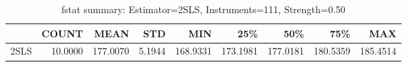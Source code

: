 \begin{table}[ht]
\centering
\caption{fstat summary: Estimator=2SLS, Instruments=111, Strength=0.50}
\begin{tabular}{lrrrrrrrr}
\toprule
 & COUNT & MEAN & STD & MIN & 25\% & 50\% & 75\% & MAX \\
\midrule
2SLS & 10.0000 & 177.0070 & 5.1944 & 168.9331 & 173.1981 & 177.0181 & 180.5359 & 185.4514 \\
\bottomrule
\end{tabular}
\end{table}
